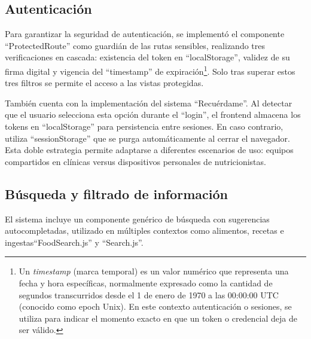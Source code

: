 \subsection*{Autenticación}
Para garantizar la seguridad de autenticación, se implementó el componente ``ProtectedRoute'' como guardián de las rutas sensibles, realizando tres verificaciones en cascada: existencia del token en ``localStorage'', validez de su firma digital y vigencia del ``timestamp'' de expiración\footnote{Un \textit{timestamp} (marca temporal) es un valor numérico que representa una fecha y hora específicas, normalmente expresado como la cantidad de segundos transcurridos desde el 1 de enero de 1970 a las 00:00:00 UTC (conocido como epoch Unix). En este contexto autenticación o sesiones, se utiliza para indicar el momento exacto en que un token o credencial deja de ser válido.}. Solo tras superar estos tres filtros se permite el acceso a las vistas protegidas.

También cuenta con la implementación del sistema ``Recuérdame''. Al detectar que el usuario selecciona esta opción durante el ``login'', el frontend almacena los tokens en ``localStorage'' para persistencia entre sesiones. En caso contrario, utiliza ``sessionStorage'' que se purga automáticamente al cerrar el navegador. Esta doble estrategia permite adaptarse a diferentes escenarios de uso: equipos compartidos en clínicas versus dispositivos personales de nutricionistas.

\subsection*{Búsqueda y filtrado de información}
El sistema incluye un componente genérico de búsqueda con sugerencias autocompletadas, utilizado en múltiples contextos como alimentos, recetas e ingestas``FoodSearch.js'' y ``Search.js''.

